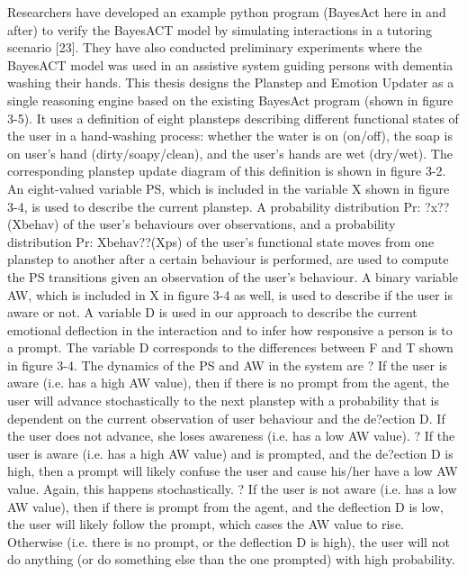 Researchers have developed an example python program (BayesAct here in and after) to verify the BayesACT model by simulating interactions in a tutoring scenario [23]. They have also conducted preliminary experiments where the BayesACT model was used in an assistive system guiding persons with dementia washing their hands. This thesis designs the Planstep and Emotion Updater as a single reasoning engine based on the existing BayesAct program (shown in figure 3-5). It uses a definition of eight plansteps describing different functional states of the user in a hand-washing process: whether the water is on (on/off), the soap is on user's hand (dirty/soapy/clean), and the user's hands are wet (dry/wet). The corresponding planstep update diagram of this definition is shown in figure 3-2. An eight-valued variable PS, which is included in the variable X shown in figure 3-4, is used to describe the current planstep. A probability distribution Pr: ?x??(Xbehav) of the user's behaviours over observations, and a probability distribution Pr: Xbehav??(Xps) of the user's functional state moves from one planstep to another after a certain behaviour is performed, are used to compute the PS transitions given an observation of the user's behaviour. A binary variable AW, which is included in X in figure 3-4 as well, is used to describe if the user is aware or not. A variable D is used in our approach to describe the current emotional deflection in the interaction and to infer how responsive a person is to a prompt. The variable D corresponds to the differences between F and T shown in figure 3-4. The dynamics of the PS and AW in the system are
? If the user is aware (i.e. has a high AW value), then if there is no prompt from the agent, the user will advance stochastically to the next planstep with a probability that is dependent on the current observation of user behaviour and the de?ection D. If the user does not advance, she loses awareness (i.e. has a low AW value).
? If the user is aware (i.e. has a high AW value) and is prompted, and the de?ection D is high, then a prompt will likely confuse the user and cause his/her have a low AW value. Again, this happens stochastically.
? If the user is not aware (i.e. has a low AW value), then if there is prompt from the agent, and the deflection D is low, the user will likely follow the prompt, which cases the AW value to rise. Otherwise (i.e. there is no prompt, or the deflection D is high), the user will not do anything (or do something else than the one prompted) with high probability.


